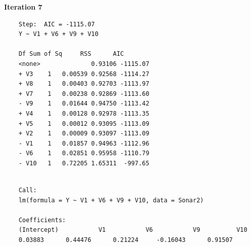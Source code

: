 \documentclass[a4paper,12pt]{article}
\begin{document}
\noindent \textbf{Iteration 7}
\begin{framed}
	\begin{verbatim}
	Step:  AIC = -1115.07
	Y ~ V1 + V6 + V9 + V10
	
	Df Sum of Sq     RSS      AIC
	<none>              0.93106 -1115.07
	+ V3    1   0.00539 0.92568 -1114.27
	+ V8    1   0.00403 0.92703 -1113.97
	+ V7    1   0.00238 0.92869 -1113.60
	- V9    1   0.01644 0.94750 -1113.42
	+ V4    1   0.00128 0.92978 -1113.35
	+ V5    1   0.00012 0.93095 -1113.09
	+ V2    1   0.00009 0.93097 -1113.09
	- V1    1   0.01857 0.94963 -1112.96
	- V6    1   0.02851 0.95958 -1110.79
	- V10   1   0.72205 1.65311  -997.65
	
	\end{verbatim}
\end{framed}
\newpage
\begin{framed}
	\begin{verbatim}
	Call:
	lm(formula = Y ~ V1 + V6 + V9 + V10, data = Sonar2)
	
	Coefficients:
	(Intercept)           V1           V6           V9          V10  
	0.03883      0.44476      0.21224     -0.16043      0.91507  
	\end{verbatim}
\end{framed}


%
%
%
\end{document}
